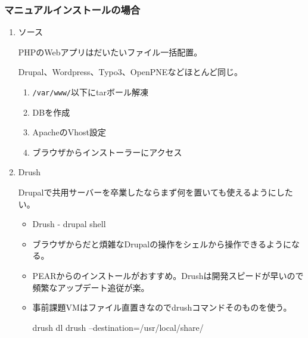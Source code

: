 \documentclass[mingoth,a4paper]{jsarticle}
\begin{document}
\subsubsection{マニュアルインストールの場合}

\begin{enumerate}
\item ソース

PHPのWebアプリはだいたいファイル一括配置。

Drupal、Wordpress、Typo3、OpenPNEなどほとんど同じ。
\begin{enumerate}
\item {\tt /var/www/}以下にtarボール解凍
\item DBを作成
\item ApacheのVhost設定
\item ブラウザからインストーラーにアクセス
\end{enumerate}

\item Drush

Drupalで共用サーバーを卒業したならまず何を置いても使えるようにしたい。
\begin{itemize}
\item Drush - drupal shell\cite{drush}
\item ブラウザからだと煩雑なDrupalの操作をシェルから操作できるようになる。
\item PEARからのインストールがおすすめ。Drushは開発スピードが早いので頻繁なアップデート追従が楽。
\item 事前課題VMはファイル直置きなのでdrushコマンドそのものを使う。

\begin{commandline}
drush dl drush --destination=/usr/local/share/
\end{commandline}

\clearpage


\end{itemize}
\end{enumerate}
\end{document}
